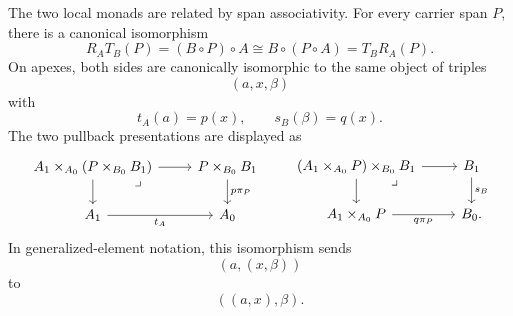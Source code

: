 The two local monads are related by span associativity. For every carrier span \(P\), there is a canonical isomorphism
\[
    R_A T_B(P)
    =
    (B\circ P)\circ A
    \cong
    B\circ(P\circ A)
    =
    T_B R_A(P).
\]
On apexes, both sides are canonically isomorphic to the same object of triples
\[
    (a,x,\beta)
\]
with
\[
    t_A(a)=p(x),
    \qquad
    s_B(\beta)=q(x).
\]
The two pullback presentations are displayed as
\[
    \begin{tikzcd}
            A_1\times_{A_0}(P\times_{B_0}B_1)
                \arrow[r]
                \arrow[d]
                \arrow[dr, phantom, "\lrcorner", very near start]
        &
            P\times_{B_0}B_1
                \arrow[d, "p\pi_P"]
        \\
            A_1
                \arrow[r, "t_A"']
        &
            A_0
    \end{tikzcd}
    \qquad
    \begin{tikzcd}
            (A_1\times_{A_0}P)\times_{B_0}B_1
                \arrow[r]
                \arrow[d]
                \arrow[dr, phantom, "\lrcorner", very near start]
        &
            B_1
                \arrow[d, "s_B"]
        \\
            A_1\times_{A_0}P
                \arrow[r, "q\pi_P"']
        &
            B_0.
    \end{tikzcd}
\]
In generalized-element notation, this isomorphism sends
\[
    (a,(x,\beta))
\]
to
\[
    ((a,x),\beta).
\]

